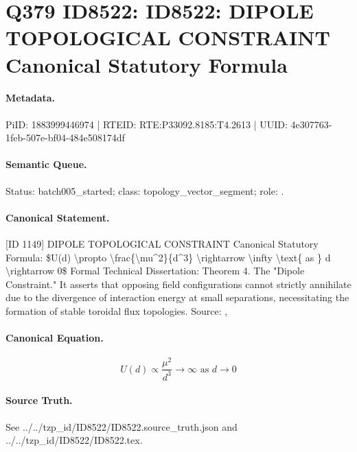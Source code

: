 \section*{Q379 ID8522: ID8522: DIPOLE TOPOLOGICAL CONSTRAINT Canonical Statutory Formula}
\paragraph{Metadata.}
PiID: 1883999446974 | RTEID: RTE:P33092.8185:T4.2613 | UUID: 4e307763-1feb-507e-bf04-484e508174df

\paragraph{Semantic Queue.}
Status: batch005\_started; class: topology\_vector\_segment; role: .

\paragraph{Canonical Statement.}
[ID 1149] DIPOLE TOPOLOGICAL CONSTRAINT Canonical Statutory Formula: \$U(d) \textbackslash{}propto \textbackslash{}frac\{\textbackslash{}mu\textasciicircum{}2\}\{d\textasciicircum{}3\} \textbackslash{}rightarrow \textbackslash{}infty \textbackslash{}text\{ as \} d \textbackslash{}rightarrow 0\$ Formal Technical Dissertation: Theorem 4. The "Dipole Constraint." It asserts that opposing field configurations cannot strictly annihilate due to the divergence of interaction energy at small separations, necessitating the formation of stable toroidal flux topologies. Source: ,

\paragraph{Canonical Equation.}
\[
U(d) \propto \frac{\mu^2}{d^3} \rightarrow \infty \text{ as } d \rightarrow 0
\]

\paragraph{Source Truth.}
See ../../tzp\_id/ID8522/ID8522.source\_truth.json and ../../tzp\_id/ID8522/ID8522.tex.

